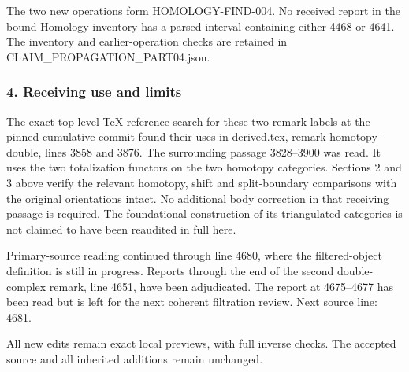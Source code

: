 The two new operations form HOMOLOGY-FIND-004. No received report in the bound Homology inventory has a parsed interval containing either 4468 or 4641. The inventory and earlier-operation checks are retained in CLAIM\_PROPAGATION\_PART04.json.

\subsubsection{4. Receiving use and limits}\label{receiving-use-and-limits}

The exact top-level TeX reference search for these two remark labels at the pinned cumulative commit found their uses in derived.tex, remark-homotopy-double, lines 3858 and 3876. The surrounding passage 3828--3900 was read. It uses the two totalization functors on the two homotopy categories. Sections 2 and 3 above verify the relevant homotopy, shift and split-boundary comparisons with the original orientations intact. No additional body correction in that receiving passage is required. The foundational construction of its triangulated categories is not claimed to have been reaudited in full here.

Primary-source reading continued through line 4680, where the filtered-object definition is still in progress. Reports through the end of the second double-complex remark, line 4651, have been adjudicated. The report at 4675--4677 has been read but is left for the next coherent filtration review. Next source line: 4681.

All new edits remain exact local previews, with full inverse checks. The accepted source and all inherited additions remain unchanged.
